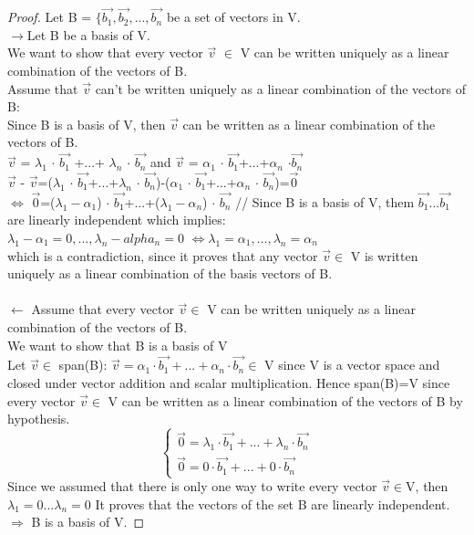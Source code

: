 \documentclass{article}
\newtheorem*{Uniqueness of representation*}{Uniqueness of representation}
\begin{document}
\begin{proof}
Let B = $\{\vec{b_1},\vec{b_2},...,\vec{b_n}$ be a set of vectors in V. \\
$\rightarrow $Let B be a basis of  V.\\
We want to show that every vector $\vec{v}$ $\in$ V can be written uniquely as a linear combination of the vectors of B. \\
Assume that $\vec{v}$ can't be written uniquely as a linear combination of the vectors of B: \\
Since B is a basis of V, then $\vec{v}$ can be written as a linear combination of the vectors of B.\\
$\vec{v}$ = $\lambda_{1}$  $\cdot$ $\vec{b_1}$ +...+ $\lambda_{n}$ $\cdot$ $\vec{b_n}$ and $\vec{v}$ = $\alpha_{1}$ $\cdot$
$\vec{b_1}$+...+$\alpha_{n}$ $\cdot$$\vec{b_n}$ \\
$\vec{v}$ - $\vec{v}$=($\lambda_{1}$ $\cdot$ $\vec{b_1}$+...+$\lambda_{n}$ $\cdot$ $\vec{b_n}$)-($\alpha_{1}$ $\cdot$ $\vec{b_1}$+...+$\alpha_{n}$ $\cdot$ $\vec{b_n}$)=$\vec{0}$ \\
$\iff$ $\vec{0}$=($\lambda_1-\alpha_1$) $\cdot$ $\vec{b_1}$+...+($\lambda_1-\alpha_n$) $\cdot$ $\vec{b_n}$ //
Since B is a basis of V, them $\vec{b_1}...\vec{b_1}$ are linearly independent which implies: \\
$\lambda_1-\alpha_1=0,...,\lambda_n-alpha_n=0$ $\iff \lambda_1=\alpha_1,...,\lambda_n=\alpha_n$ \\
which is a contradiction, since it proves that any vector $ \vec{v} \in$ V is written uniquely as
a linear combination of the basis vectors of B.\\ \\
$\leftarrow$ Assume that every vector $\vec{v} \in$ V can be written uniquely as a linear combination
of the vectors of B.\\
We want to show that B is a basis of V \\
Let $\vec{v} \in$ span(B): $\vec{v}=\alpha_1 \cdot \vec{b_1}+...+\alpha_n \cdot \vec{b_n} \in$ V
since V is a vector space and closed under vector addition and scalar multiplication.
Hence span(B)=V since every vector $\vec{v} \in$ V can be written as a linear combination
of the vectors of B by hypothesis.\\


    \[
\left\{
                \begin{array}{ll}
                  \vec{0}=\lambda_1 \cdot \vec{b_1}+...+\lambda_n \cdot \vec{b_n}\\
                  \vec{0}=0 \cdot \vec{b_1}+...+0 \cdot \vec{b_n}
                \end{array}
              \right.
  \]
  Since we assumed that there is only one way to write every vector $\vec{v} \in$V, then $\lambda_1=0...\lambda_n=0$
  It proves that the vectors of the set B are linearly independent.
  $\Rightarrow $ B is a basis of V.
\end{proof}
\setcounter{section}{4}
\pagebreak
\end{document}
